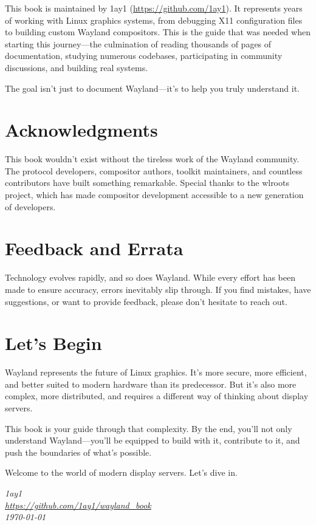 This book is maintained by 1ay1 (\url{https://github.com/1ay1}). It represents years of working with Linux graphics systems, from debugging X11 configuration files to building custom Wayland compositors. This is the guide that was needed when starting this journey—the culmination of reading thousands of pages of documentation, studying numerous codebases, participating in community discussions, and building real systems.

The goal isn't just to document Wayland—it's to help you truly understand it.

\section*{Acknowledgments}

This book wouldn't exist without the tireless work of the Wayland community. The protocol developers, compositor authors, toolkit maintainers, and countless contributors have built something remarkable. Special thanks to the wlroots project, which has made compositor development accessible to a new generation of developers.

\section*{Feedback and Errata}

Technology evolves rapidly, and so does Wayland. While every effort has been made to ensure accuracy, errors inevitably slip through. If you find mistakes, have suggestions, or want to provide feedback, please don't hesitate to reach out.

\section*{Let's Begin}

Wayland represents the future of Linux graphics. It's more secure, more efficient, and better suited to modern hardware than its predecessor. But it's also more complex, more distributed, and requires a different way of thinking about display servers.

This book is your guide through that complexity. By the end, you'll not only understand Wayland—you'll be equipped to build with it, contribute to it, and push the boundaries of what's possible.

Welcome to the world of modern display servers. Let's dive in.

\vspace{1cm}

\begin{flushright}
\textit{1ay1}\\
\textit{\url{https://github.com/1ay1/wayland_book}}\\
\textit{\today}
\end{flushright}

\clearpage
